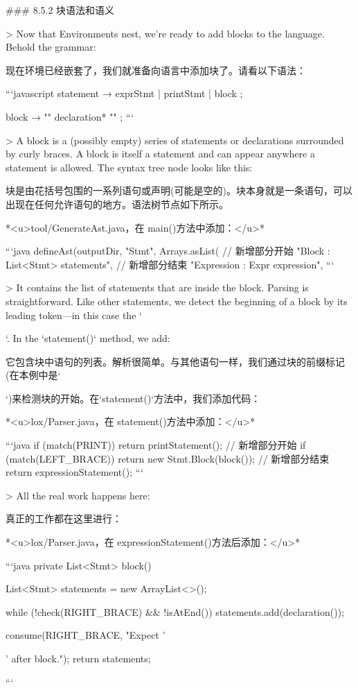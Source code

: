 \documentclass[cn,11pt,chinese]{elegantbook}
\begin{document}
{{{{### 8.5.2 块语法和语义

> Now that Environments nest, we’re ready to add blocks to the language. Behold the grammar:

现在环境已经嵌套了，我们就准备向语言中添加块了。请看以下语法：

```javascript
statement      → exprStmt
               | printStmt
               | block ;

block          → "{" declaration* "}" ;
```

> A block is a (possibly empty) series of statements or declarations surrounded by curly braces. A block is itself a statement and can appear anywhere a statement is allowed. The syntax tree node looks like this:

块是由花括号包围的一系列语句或声明(可能是空的)。块本身就是一条语句，可以出现在任何允许语句的地方。语法树节点如下所示。

*<u>tool/GenerateAst.java，在 main()方法中添加：</u>*

```java
    defineAst(outputDir, "Stmt", Arrays.asList(
      // 新增部分开始
      "Block      : List<Stmt> statements",
      // 新增部分结束
      "Expression : Expr expression",
```

> It contains the list of statements that are inside the block. Parsing is straightforward. Like other statements, we detect the beginning of a block by its leading token—in this case the `{`. In the `statement()` method, we add:

它包含块中语句的列表。解析很简单。与其他语句一样，我们通过块的前缀标记(在本例中是`{`)来检测块的开始。在`statement()`方法中，我们添加代码：

*<u>lox/Parser.java，在 statement()方法中添加：</u>*

```java
    if (match(PRINT)) return printStatement();
    // 新增部分开始
    if (match(LEFT_BRACE)) return new Stmt.Block(block());
    // 新增部分结束
    return expressionStatement();
```

> All the real work happens here:

真正的工作都在这里进行：

*<u>lox/Parser.java，在 expressionStatement()方法后添加：</u>*

```java
  private List<Stmt> block() {
    List<Stmt> statements = new ArrayList<>();

    while (!check(RIGHT_BRACE) && !isAtEnd()) {
      statements.add(declaration());
    }

    consume(RIGHT_BRACE, "Expect '}' after block.");
    return statements;
  }
```

}}}}}
\end{document}
